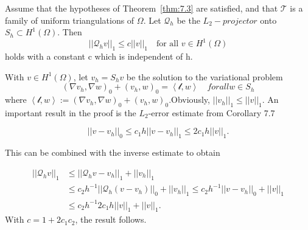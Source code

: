 \begin{corollary}
    Assume that the hypotheses of Theorem~\ref{thm:7.3} are satisfied, and that $\mathcal{T}$ is a family of uniform triangulations of $\Omega$. Let $\mathcal{Q}_h$ be the $L_2-projector$ onto $S_h \subset H^1(\Omega)$. Then
    \begin{equation}
        ||\mathcal{Q}_h v||_1 \leq c||v||_1\quad \text{for all } v\in H^1(\Omega)
    \end{equation}
    holds with a constant c which is independent of h.
\end{corollary}

\begin{bev}
    With $v \in H^1(\Omega)$, let $v_h = S_h v$ be the solution to the variational problem
    \begin{equation}
        {\left( \nabla v_h, \nabla w \right)}_0 + {\left( v_h, w \right)}_0 = \left< \mathcal{l}, w \right> \quad for all w \in S_h
    \end{equation}
    where $\left< \mathcal{l}, w \right> := {\left( \nabla v_h, \nabla w \right)}_0 + {\left( v_h, w \right)}_0$.Obviously, $||v_h||_1 \leq ||v||_1$. An important result in the proof is the $L_2$-error estimate from Corollary 7.7 %

    \begin{equation}
        ||v - v_h||_0 \leq c_1h||v-v_h||_1 \leq 2c_1h||v||_1.
    \end{equation}

    This can be combined with the inverse estimate to obtain %

    \begin{align}
        || \mathcal{Q}_h v ||_1 &\leq || \mathcal{Q}_h v - v_h||_1 + ||v_h||_1 \\
                                &\leq c_2 h^{-1} ||\mathcal{Q}_h \left( v - v_h \right)||_0 + ||v_h||_1 \leq c_2h^{-1}||v-v_h||_0 + ||v||_1 \\
                                &\leq c_2h^{-1}2c_1h||v||_1 + ||v||_1.
    \end{align}
    With $c = 1+ 2c_1c_2$, the result follows.
\end{bev}